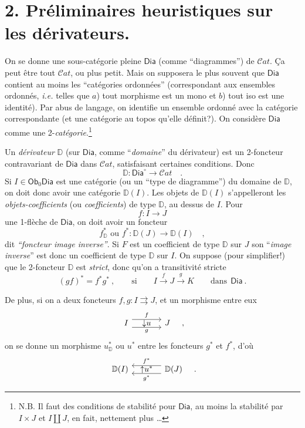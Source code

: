 \documentclass[11pt]{article}
\newcommand{\printedpage}[1]{\marginpar{\footnotesize p.~#1}}
\newcommand{\msp}[1]{\marginpar{\footnotesize [#1]}}
\newcommand{\Dia}{\mathsf{Dia}}
\newcommand{\Cat}{\mathcal{C}\mathit{at}}
\newcommand{\DD}{\mathbb{D}}
\newcommand{\Ob}{\mathsf{Ob}}
\begin{document}
\printedpage{4}

\msp{page 4}

\section*{2. Préliminaires heuristiques sur les dérivateurs.}

On se donne une sous-catégorie pleine $\Dia$ (comme “diagrammes”) de $\Cat$. Ça peut être tout $\Cat$, ou plus petit. Mais on supposera le plus souvent que $\Dia$ contient au moins les “catégories ordonnées” (correspondant aux ensembles ordonnés, \textit{i.e.} telles que $a$) tout morphisme est un mono et $b$) tout iso est une identité). Par abus de langage, on identifie un ensemble ordonné avec la catégorie correspondante (et une catégorie au topos qu'elle définit?). On considère $\Dia$ comme une 2-\textit{catégorie}.\footnote{N.B. Il faut des conditions de stabilité pour $\Dia$, au moins la stabilité par $I \times J$ et $I \amalg J$, en fait, nettement plus \dots}

Un \textit{dérivateur} $\DD$ (sur $\Dia$, comme “\textit{domaine}” du dérivateur) est un 2-foncteur contravariant de $\Dia$ dans $\Cat$, satisfaisant certaines conditions. Donc
\[ \DD : \Dia^{\circ} \longrightarrow \Cat \quad . \]
Si $I \in \Ob_0 \Dia$ est une catégorie (ou un “type de diagramme”) du domaine de $\DD$, on doit donc avoir une catégorie $\DD(I)$. Les objets de $\DD(I)$ s'appelleront les \textit{objets-coefficients} (ou \textit{coefficients}) de type $\DD$, au dessus de $I$. Pour
\[ f : I \longrightarrow J \]
une 1-flèche de $\Dia$, on doit avoir un foncteur
\[ f^*_{\DD} \text{ ou } f^* : \DD(J) \longrightarrow \DD(I) \quad , \]
dit \textit{“foncteur image inverse”}. Si $F$ est un coefficient de type $\DD$ sur $J$ son “\textit{image inverse}” est donc un coefficient de type $\DD$ sur $I$. On suppose (pour simplifier!) que le 2-foncteur $\DD$ est \textit{strict}, donc qu'on a transitivité stricte
\[ (gf)^* = f^*g^* \ , \qquad \text{si} \qquad I \xrightarrow{f} J \xrightarrow{g} K \qquad \text{dans} \ \ \Dia \ . \]

\msp{page 5}

De plus, si on a deux foncteurs $f, g : I \rightrightarrows J$, et un morphisme entre eux
\[
\begin{tikzcd}[column sep=large]
I \arrow[r, shift left=2, "f"] \arrow[r, shift right=2, "g"'] \arrow[r, phantom, "{\downarrow}u"] & J
\end{tikzcd}
\quad ,
\]
on se donne un morphisme $u^*_{\DD}$ ou $u^*$ entre les foncteurs $g^*$ et $f^*$, d'où
\[
\begin{tikzcd}[column sep=large]
\DD(I) & \DD(J) \arrow[l, shift right=2, "f^*"'] \arrow[l, shift left=2, "g^*"] \arrow[l, phantom, "{\uparrow}u^*"]
\end{tikzcd}
\quad .
\]
\end{document}
